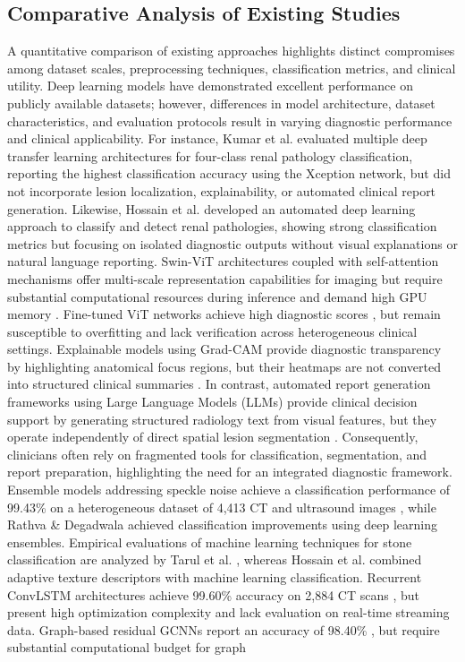\documentclass[]{elsarticle}
\begin{document}
\subsection{Comparative Analysis of Existing Studies}
A quantitative comparison of existing approaches highlights distinct compromises among dataset scales, preprocessing techniques, classification metrics, and clinical utility. Deep learning models have demonstrated excellent performance on publicly available datasets; however, differences in model architecture, dataset characteristics, and evaluation protocols result in varying diagnostic performance and clinical applicability. For instance, Kumar et al. \cite{kumar2024comprehensive} evaluated multiple deep transfer learning architectures for four-class renal pathology classification, reporting the highest classification accuracy using the Xception network, but did not incorporate lesion localization, explainability, or automated clinical report generation. Likewise, Hossain et al. \cite{hossain2025detection} developed an automated deep learning approach to classify and detect renal pathologies, showing strong classification metrics but focusing on isolated diagnostic outputs without visual explanations or natural language reporting. Swin-ViT architectures coupled with self-attention mechanisms offer multi-scale representation capabilities for imaging but require substantial computational resources during inference and demand high GPU memory \cite{aburass2025vision, liu2021swin}. Fine-tuned ViT networks achieve high diagnostic scores \cite{dosovitskiy2020image}, but remain susceptible to overfitting and lack verification across heterogeneous clinical settings. Explainable models using Grad-CAM provide diagnostic transparency by highlighting anatomical focus regions, but their heatmaps are not converted into structured clinical summaries \cite{holzinger2019causability, selvaraju2017grad}. In contrast, automated report generation frameworks using Large Language Models (LLMs) provide clinical decision support by generating structured radiology text from visual features, but they operate independently of direct spatial lesion segmentation \cite{liu2024bootstrapping, sloan2024automated}. Consequently, clinicians often rely on fragmented tools for classification, segmentation, and report preparation, highlighting the need for an integrated diagnostic framework. Ensemble models addressing speckle noise achieve a classification performance of 99.43\% on a heterogeneous dataset of 4,413 CT and ultrasound images \cite{obaid2025noisy}, while Rathva \& Degadwala \cite{rathva2025ensemble} achieved classification improvements using deep learning ensembles. Empirical evaluations of machine learning techniques for stone classification are analyzed by Tarul et al. \cite{tarul2025empirical}, whereas Hossain et al. \cite{hossain2024adaptive} combined adaptive texture descriptors with machine learning classification. Recurrent ConvLSTM architectures achieve 99.60\% accuracy on 2,884 CT scans \cite{khan2025multi}, but present high optimization complexity and lack evaluation on real-time streaming data. Graph-based residual GCNNs report an accuracy of 98.40\% \cite{verma2025automated}, but require substantial computational budget for graph 
\end{document}
